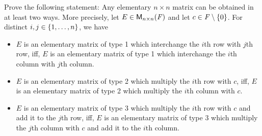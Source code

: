 \exercisesection

\setcounter{ex}{3}
\begin{ex}\label{ex:3.1.4}
  Prove the following statement:
  Any elementary \(n \times n\) matrix can be obtained in at least two ways.
  More precisely, let \(E \in \ms[n][n][\F]\) and let \(c \in \mathit{F} \setminus \left\lbrace0\right\rbrace\).
  For distinct \(i, j \in \left\lbrace1, \dots, n\right\rbrace\), we have
  \begin{itemize}
    \item \(E\) is an elementary matrix of type 1 which interchange the \(i\)th row with \(j\)th row, iff, \(E\) is an elementary matrix of type 1 which interchange the \(i\)th column with \(j\)th column.
    \item \(E\) is an elementary matrix of type 2 which multiply the \(i\)th row with \(c\), iff, \(E\) is an elementary matrix of type 2 which multiply the \(i\)th column with \(c\).
    \item \(E\) is an elementary matrix of type 3 which multiply the \(i\)th row with \(c\) and add it to the \(j\)th row, iff, \(E\) is an elementary matrix of type 3 which multiply the \(j\)th column with \(c\) and add it to the \(i\)th column.
  \end{itemize}
\end{ex}

